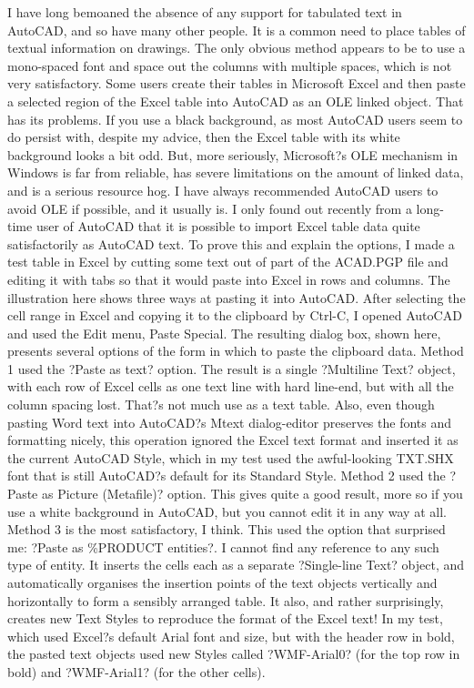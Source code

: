 \documentclass[a4paper]{article}
\newcommand\partone[1]{{   \fontspec{CAMBERIC.TTF} \fontsize{16}{32} \selectfont #1}}
\begin{document}
\partone{
I have long bemoaned the absence of any support for tabulated text in AutoCAD, and so have many other people. It is a common need to place tables of textual information on drawings. The only obvious method appears to be to use a mono-spaced font and space out the columns with multiple spaces, which is not very satisfactory.
Some users create their tables in Microsoft Excel and then paste a selected region of the Excel table into AutoCAD as an OLE linked object. That has its problems. If you use a black background, as most AutoCAD users seem to do persist with, despite my advice, then the Excel table with its white background looks a bit odd. But, more seriously, Microsoft?s OLE mechanism in Windows is far from reliable, has severe limitations on the amount of linked data, and is a serious resource hog. I have always recommended AutoCAD users to avoid OLE if possible, and it usually is.
I only found out recently from a long-time user of AutoCAD that it is possible to import Excel table data quite satisfactorily as AutoCAD text. To prove this and explain the options, I made a test table in Excel by cutting some text out of part of the ACAD.PGP file and editing it with tabs so that it would paste into Excel in rows and columns. The illustration here shows three ways at pasting it into AutoCAD. After selecting the cell range in Excel and copying it to the clipboard by Ctrl-C, I opened AutoCAD and used the Edit menu, Paste Special. The resulting dialog box, shown here, presents several options of the form in which to paste the clipboard data.
Method 1 used the ?Paste as text? option. The result is a single ?Multiline Text? object, with each row of Excel cells as one text line with hard line-end, but with all the column spacing lost. That?s not much use as a text table. Also, even though pasting Word text into AutoCAD?s Mtext dialog-editor preserves the fonts and formatting nicely, this operation ignored the Excel text format and inserted it as the current AutoCAD Style, which in my test used the awful-looking TXT.SHX font that is still AutoCAD?s default for its Standard Style.
Method 2 used the ?Paste as Picture (Metafile)? option. This gives quite a good result, more so if you use a white background in AutoCAD, but you cannot edit it in any way at all. 
Method 3 is the most satisfactory, I think. This used the option that surprised me: ?Paste as \%PRODUCT entities?. I cannot find any reference to any such type of entity. It inserts the cells each as a separate ?Single-line Text? object, and automatically organises the insertion points of the text objects vertically and horizontally to form a sensibly arranged table. It also, and rather surprisingly, creates new Text Styles to reproduce the format of the Excel text! In my test, which used Excel?s default Arial font and size, but with the header row in bold, the pasted text objects used new Styles called ?WMF-Arial0? (for the top row in bold) and ?WMF-Arial1? (for the other cells).
}
\end{document}
